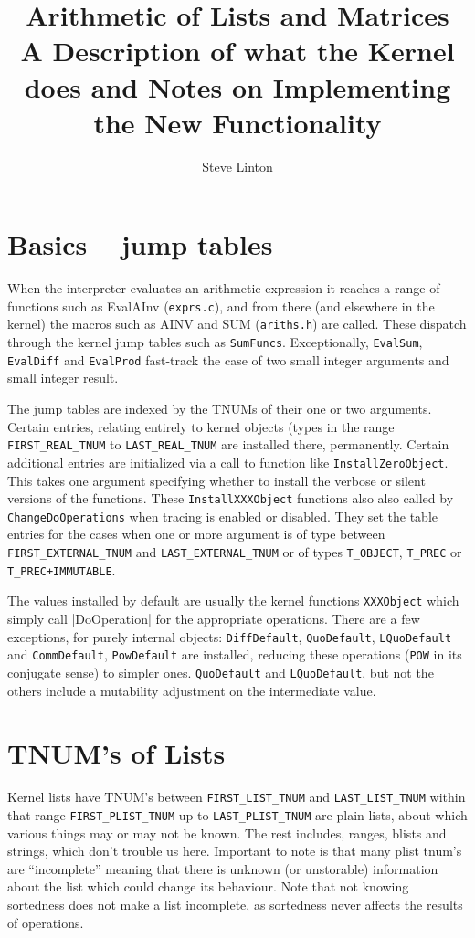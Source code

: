 \documentclass{article}
\title{Arithmetic of Lists and Matrices\\
A Description of what the Kernel does and Notes on Implementing the
New Functionality}
\author{Steve Linton}
\begin{document}
\maketitle
\section{Basics -- jump tables}

When the interpreter evaluates an arithmetic expression it reaches a
range of functions such as EvalAInv (\verb|exprs.c|), and from there
(and elsewhere in the kernel) the macros such as AINV and SUM
(\verb|ariths.h|) are called. These dispatch through the kernel jump
tables such as \verb|SumFuncs|. Exceptionally, \verb|EvalSum|, \verb|EvalDiff| and
\verb|EvalProd| fast-track the case of two small integer arguments and
small integer result. 

The jump tables  are indexed by the TNUMs of their
one or two arguments. Certain entries, relating entirely to kernel
objects (types in the range \verb|FIRST_REAL_TNUM| to
\verb|LAST_REAL_TNUM| are installed there, permanently. 
Certain additional entries are initialized via a call to function like
\verb|InstallZeroObject|. This takes one argument specifying whether
to install the verbose or silent versions of the functions. These
\verb|InstallXXXObject| functions also also called by
\verb|ChangeDoOperations| when tracing is enabled or disabled. They
set the table entries for the cases when one or more argument  is of
type between \verb|FIRST_EXTERNAL_TNUM| and \verb|LAST_EXTERNAL_TNUM|
or of types \verb|T_OBJECT|, \verb|T_PREC| or \verb|T_PREC+IMMUTABLE|.


The values installed by default are usually the kernel functions
\verb|XXXObject| which simply call |DoOperation| for the appropriate
operations. There are a few exceptions, for purely internal objects:
\verb|DiffDefault|, \verb|QuoDefault|, \verb|LQuoDefault| and
\verb|CommDefault|, \verb|PowDefault|  are installed, reducing these
operations (\verb|POW| in its conjugate sense) to simpler
ones. \verb|QuoDefault| and \verb|LQuoDefault|, but not the others
include a mutability adjustment on the intermediate value.

\section{TNUM's of Lists}

Kernel lists have TNUM's between \verb|FIRST_LIST_TNUM| and
\verb|LAST_LIST_TNUM| within that range \verb|FIRST_PLIST_TNUM| up to
\verb|LAST_PLIST_TNUM| are plain lists, about which various things may
or may not be known. The rest includes, ranges, blists and strings,
which don't trouble us here.  Important to note is that many plist
tnum's are ``incomplete'' meaning that there is unknown (or
unstorable) information about the list which could change its
behaviour. Note that not knowing sortedness does not make a list
incomplete, as sortedness never affects the results of operations.
\end{document}

